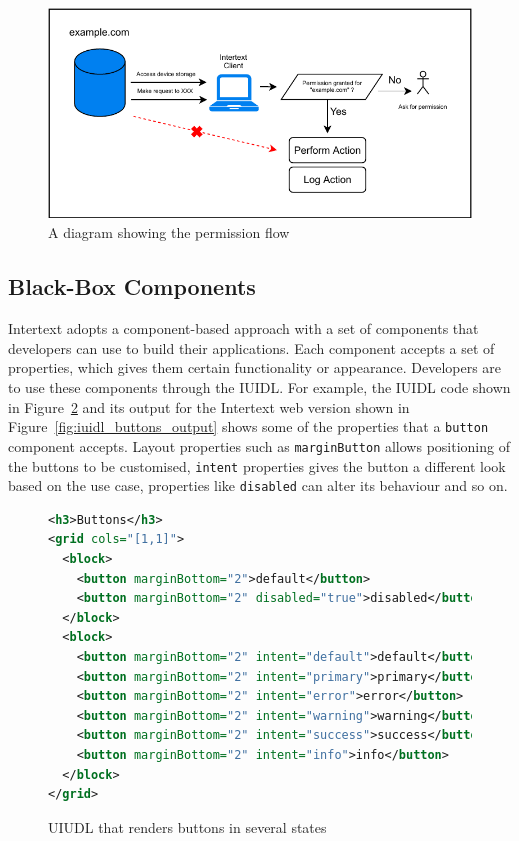 \begin{figure}
  \centering
  \includegraphics[width=13cm]{thesis/paper/images/permission.pdf}
  \caption{A diagram showing the permission flow}%
  \label{fig:permission_flow}%
\end{figure}


\subsection{Black-Box Components}

Intertext adopts a component-based approach with a set of components that developers can use to build their applications. Each component accepts a set of properties, which gives them certain functionality or appearance. Developers are to use these components through the IUIDL. For example, the IUIDL code shown in Figure~\ref{fig:iuidl_buttons} and its output for the Intertext web version shown in Figure~\ref{fig:iuidl_buttons_output} shows some of the properties that a \texttt{button} component accepts. Layout properties such as \texttt{marginButton} allows positioning of the buttons to be customised, \texttt{intent} properties gives the button a different look based on the use case, properties like \texttt{disabled} can alter its behaviour and so on.

\begin{figure}[htb]
\begin{minipage}{\linewidth}
\begin{lstlisting}[language=xml]
<h3>Buttons</h3>
<grid cols="[1,1]">
  <block>
    <button marginBottom="2">default</button>
    <button marginBottom="2" disabled="true">disabled</button>
  </block>
  <block>
    <button marginBottom="2" intent="default">default</button>
    <button marginBottom="2" intent="primary">primary</button>
    <button marginBottom="2" intent="error">error</button>
    <button marginBottom="2" intent="warning">warning</button>
    <button marginBottom="2" intent="success">success</button>
    <button marginBottom="2" intent="info">info</button>
  </block>
</grid>
\end{lstlisting}
\end{minipage}
\caption{UIUDL that renders buttons in several states}%
\label{fig:iuidl_buttons}%
\end{figure}

